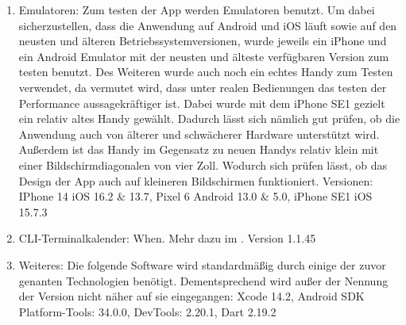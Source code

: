 \begin{enumerate}
	\item Emulatoren: %
		Zum testen der App werden Emulatoren benutzt. Um dabei sicherzustellen, dass die Anwendung auf Android und iOS läuft sowie auf den neusten und älteren Betriebssystemversionen, wurde jeweils ein iPhone und ein Android Emulator mit der neusten und älteste verfügbaren Version zum testen benutzt. %
		Des Weiteren wurde auch noch ein echtes Handy zum Testen verwendet, da vermutet wird, dass unter realen Bedienungen das testen der Performance aussagekräftiger ist. Dabei wurde mit dem iPhone SE1 gezielt ein relativ altes Handy gewählt. %
			Dadurch lässt sich nämlich gut prüfen, ob die Anwendung auch von älterer und schwächerer Hardware unterstützt wird. %
			Außerdem ist das Handy im Gegensatz zu neuen Handys relativ klein mit einer Bildschirmdiagonalen von vier Zoll. Wodurch sich prüfen lässt, ob das Design der App auch auf kleineren Bildschirmen funktioniert. %
		Versionen: IPhone 14 iOS 16.2 \& 13.7, Pixel 6 Android 13.0 \& 5.0, iPhone SE1 iOS 15.7.3%
		
	\item CLI-Terminalkalender: When. Mehr dazu im . Version 1.1.45
		
	\item Weiteres: Die folgende Software wird standardmäßig durch einige der zuvor genanten Technologien benötigt. Dementsprechend wird außer der Nennung der Version nicht näher auf sie eingegangen: Xcode 14.2, Android SDK Platform-Tools: 34.0.0, DevTools: 2.20.1, Dart 2.19.2%
\end{enumerate}

